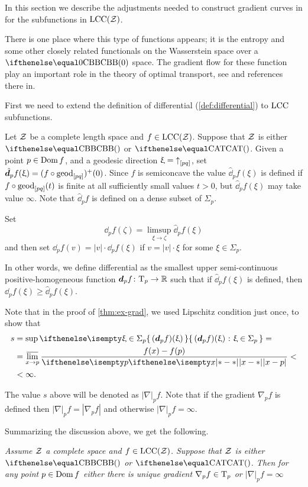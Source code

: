 In this section we describe the adjustments needed
to construct gradient curves in for the subfunctions in $\mathrm{LCC}(\mathcal{Z})$.

There is one place where this type of functions appears;
it is the entropy and some other closely related functionals on the Wasserstein space over a  $\Alex0$ space.
The gradient flow for these function play an important role in the theory of optimal transport, see \cite{villani} and references there in. 


First we need to extend the definition of differential (\ref{def:differential}) to $\mathrm{LCC}$ subfunctions.

Let $\mathcal{Z}$ be a complete length space and $f\in\LSCSC(\spc{Z})$.
Suppose that $\mathcal{Z}$ is either $\Alex{}$ or $\CAT{}$.
Given a point $p\in \Dom f$, and a geodesic direction $\upxi={\uparrow}_{[{p}{q}]}$, 
set 
$\hat \dd_pf(\xi)=(f\circ\geod_{[pq]})^+(0)$.
Since $f$ is semiconcave the value $\hat \dd_pf(\xi)$ is defined if $f\circ\geod_{[pq]}(t)$ is finite at all sufficiently small values $t>0$,
but $\hat \dd_pf(\xi)$ may take value $\infty$. 
Note that $\hat \dd_pf$ is defined on a dense subset of $\Sigma_p$.

Set 
\[\dd_pf(\zeta)=\limsup_{\xi\to\zeta}\hat\dd_pf(\xi)\]
and then set $\dd_pf(v)=|v|\cdot \dd_pf(\xi)$ if $v=|v|\cdot\xi$ for some $\xi\in\Sigma_p$.

In other words, we define differential as the smallest 
upper semi-continuous  positive-homogeneous function $\dd_pf\:\T_p\to\RR$
such that if $\hat\dd_pf(\xi)$ is defined, then $\dd_pf(\xi)\ge \hat \dd_pf(\xi)$.



Note that in the proof of \ref{thm:ex-grad}, 
we used Lipschitz condition just once,
to show that 
\begin{align*}
s&=\sup\set{(\dd_p f)(\xi)}{\xi\in\Sigma_p}=
\\
&=\limsup_{x\to p}\frac{f(x)-f(p)}{\dist{x}{p}{}}<
\\
&<\infty.
\end{align*}


The value $s$ above will be denoted as $|\nabla|_pf$.
Note that 
if the gradient $\nabla_pf$ is defined then $|\nabla|_pf=|\nabla_pf|$
and otherwise $|\nabla|_pf=\infty$.

Summarizing the discussion above, 
we get the following.

\textit{Assume $\mathcal{Z}$ a complete space and $f\in \LSCSC(\spc{Z})$. 
Suppose that $\mathcal{Z}$ is either $\Alex{}$ or $\CAT{}$.
Then for any point $p\in \Dom f$ either there is unique gradient $\nabla_p f\in \T_p$ 
or $|\nabla|_pf=\infty$}

